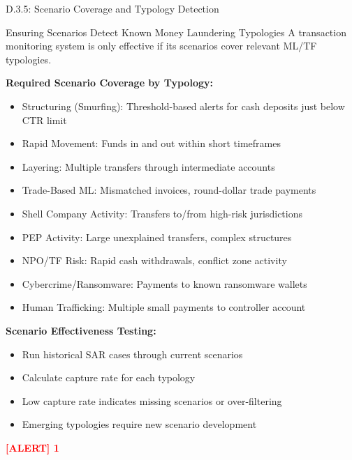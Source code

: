 \documentclass[11pt,a4paper]{beamer}
\newcommand{\redflag}[1]{\textcolor{red}{\textbf{[ALERT] 1}}}
\begin{document}
\begin{frame}{D.3.5: Scenario Coverage and Typology Detection}
	\begin{block}{Ensuring Scenarios Detect Known Money Laundering Typologies}
		A transaction monitoring system is only effective if its scenarios cover relevant ML/TF typologies.
	\end{block}
	\textbf{Required Scenario Coverage by Typology:}
	\begin{itemize}
		\item Structuring (Smurfing): Threshold-based alerts for cash deposits just below CTR limit
		\item Rapid Movement: Funds in and out within short timeframes
		\item Layering: Multiple transfers through intermediate accounts
		\item Trade-Based ML: Mismatched invoices, round-dollar trade payments
		\item Shell Company Activity: Transfers to/from high-risk jurisdictions
		\item PEP Activity: Large unexplained transfers, complex structures
		\item NPO/TF Risk: Rapid cash withdrawals, conflict zone activity
		\item Cybercrime/Ransomware: Payments to known ransomware wallets
		\item Human Trafficking: Multiple small payments to controller account
	\end{itemize}
	\textbf{Scenario Effectiveness Testing:}
	\begin{itemize}
		\item Run historical SAR cases through current scenarios
		\item Calculate capture rate for each typology
		\item Low capture rate indicates missing scenarios or over-filtering
		\item Emerging typologies require new scenario development
	\end{itemize}
	\redflag{A 77 percent false negative rate on historical SARs is a material deficiency.}
\end{frame}
\end{document}
